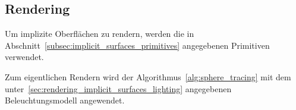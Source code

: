\subsection{Rendering}
\label{sec:rendering_implicit_surfaces_Rendering}

Um implizite Oberflächen zu rendern, werden die in
Abschnitt~\ref{subsec:implicit_surfaces_primitives} angegebenen
Primitiven verwendet.

Zum eigentlichen Rendern wird der Algorithmus~\ref{alg:sphere_tracing}
mit dem unter~\autoref{sec:rendering_implicit_surfaces_lighting}
angegebenen Beleuchtungsmodell angewendet.
